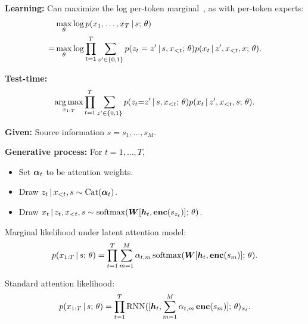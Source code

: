 \begin{frame}
\textbf{Learning:} Can maximize the log per-token marginal~\citep{gu2016incorporating}, as with per-token experts:
        \begin{align*}
        &\max_{\theta} \log p(x_1, \ldots, x_T \,|\, s ; \, \theta) \\
        = &\max_{\theta} \log \prod_{t=1}^T \sum_{z' \in\{0, 1\}} p(z_t = z' \,|\, s, x_{<t} ; \, \theta) p(x_t \,|\, z', x_{<t}, x ; \, \theta).
    \end{align*}
    
    \air
    \air
\textbf{Test-time:}
\begin{align*}
\argmax_{x_{1:T}} \prod_{t=1}^T \sum_{z' \in\{0, 1\}} p(z_t {=} z' \given s, x_{<t} \param \theta) p(x_t \given z', x_{<t}, s \param \theta).
\end{align*}
\end{frame}

\begin{frame}
\textbf{Given:} Source information $s = s_1, \ldots, s_M$.
\air

\textbf{Generative process:} For $t=1, \ldots, T$,
\begin{itemize}
    \item Set $\boldsymbol{\alpha}_t$ to be attention weights.
    \item Draw $z_{t} \,|\, x_{ < t}, s \sim \mathrm{Cat}(\boldsymbol{\alpha}_t)$.
    \item Draw $x_{t} \,|\, z_{t}, x_{< t}, s \sim \operatorname*{softmax}(\boldsymbol{W} [\boldsymbol{h}_t, \boldsymbol{\mathrm{enc}}(s_{z_{t}})] ; \, \theta)$.
\end{itemize}

\end{frame}

\begin{frame}
Marginal likelihood under latent attention model:
    \begin{align*}
       p(x_{1:T} \,|\, s ; \, \theta) = \prod_{t=1}^T \sum_{m=1}^M \alpha_{t,m} \operatorname*{softmax}(\boldsymbol{W} [\boldsymbol{h}_t, \boldsymbol{\mathrm{enc}}(s_{m})] ; \, \theta).
    \end{align*}
    
\air
\air
\air
\air

Standard attention likelihood:
    \begin{align*}
        p(x_{1:T} \,|\, s ; \, \theta) = \prod_{t=1}^T  \operatorname*{RNN}([\boldsymbol{h}_t, \sum_{m=1}^M \alpha_{t,m} \, \boldsymbol{\mathrm{enc}}(s_{m})] ; \, \theta)_{x_t}.
    \end{align*}
    
\end{frame}

